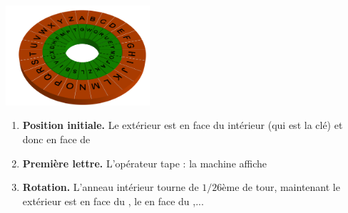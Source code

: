 \begin{frame}
\pause

{\centering 
   \qquad         \includegraphics[width=0.4\textwidth]{figures/Enigma_0_bi_unesurune.png} 
 \qquad    
{}
}

\begin{enumerate}
  \item \textbf{Position initiale.} Le  extérieur
  est en face du  intérieur (qui est la clé) et donc  en face de 
\pause

  \item  \textbf{Première lettre.} L'opérateur tape   : la machine affiche 
\pause

  \item \textbf{Rotation.} L'anneau intérieur tourne de $1/26$ème de tour, 
  maintenant le  extérieur est en face du , le  en face du ,...

%     
%   
%    
\end{enumerate}


\end{frame}

